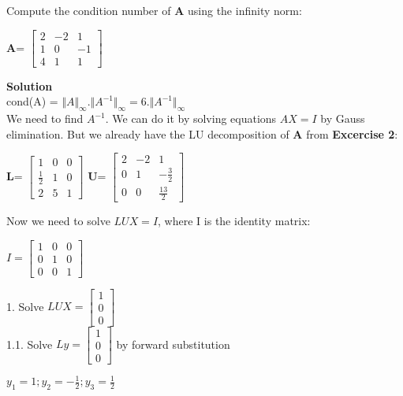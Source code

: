 \begin{exercise}{5} %
Compute the condition number of $\textbf{A}$ using the infinity norm:
\begin{center}
\textbf{A}= 
$\begin{bmatrix}
2&-2&1\\ 
1&0&-1\\
4&1&1
\end{bmatrix}
$ 
\end{center}
\textbf{Solution}\\

cond(A) = $\Vert A \Vert_\infty . \Vert A^{-1} \Vert_\infty = 6 . \Vert A^{-1} \Vert_\infty$ \\
We need to find $A^{-1}$. We can do it by solving equations $AX = I$ by Gauss elimination. But we already have the LU decomposition of \textbf{A} from \textbf{Excercise 2}: 
\begin{center}
\textbf{L}= 
$\begin{bmatrix}
1&0&0\\ 
\frac{1}{2}&1&0\\
2&5&1
\end{bmatrix}
$ 
\textbf{U}= 
$\begin{bmatrix}
2&-2&1\\ 
0&1&-\frac{3}{2}\\
0&0&\frac{13}{2}
\end{bmatrix}
$ 
\end{center}
Now we need to solve $LUX = I$, where I is the identity matrix:
\begin{center}
$ I = \begin{bmatrix}
1&0&0\\ 
0&1&0\\
0&0&1
\end{bmatrix}
$ 
\end{center}

1. Solve $LUX=\begin{bmatrix} 1\\0\\0\end{bmatrix}$\\

1.1. Solve $Ly=\begin{bmatrix} 1\\0\\0\end{bmatrix}$ by forward substitution
\begin{center}
$y_1 = 1; y_2=-\frac{1}{2};y_3=\frac{1}{2}$
\end{center}


\end{exercise}
